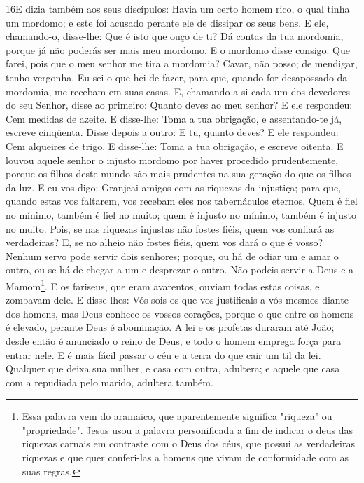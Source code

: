\lettrine{16} E dizia também aos seus discípulos: Havia um
certo homem rico, o qual tinha um mordomo; e este foi acusado
perante ele de dissipar os seus bens. E ele, chamando-o,
disse-lhe: Que é isto que ouço de ti? Dá contas da tua mordomia,
porque já não poderás ser mais meu mordomo. E o mordomo disse
consigo: Que farei, pois que o meu senhor me tira a mordomia? Cavar,
não posso; de mendigar, tenho vergonha. Eu sei o que hei de
fazer, para que, quando for desapossado da mordomia, me recebam em
suas casas. E, chamando a si cada um dos devedores do seu
Senhor, disse ao primeiro: Quanto deves ao meu senhor? E ele
respondeu: Cem medidas de azeite. E disse-lhe: Toma a tua obrigação,
e assentando-te já, escreve cinqüenta. Disse depois a outro: E
tu, quanto deves? E ele respondeu: Cem alqueires de trigo. E
disse-lhe: Toma a tua obrigação, e escreve oitenta. E louvou
aquele senhor o injusto mordomo por haver procedido prudentemente,
porque os filhos deste mundo são mais prudentes na sua geração do
que os filhos da luz. E eu vos digo: Granjeai amigos com as
riquezas da injustiça; para que, quando estas vos faltarem, vos
recebam eles nos tabernáculos eternos. Quem é fiel no mínimo,
também é fiel no muito; quem é injusto no mínimo, também é injusto
no muito. Pois, se nas riquezas injustas não fostes fiéis,
quem vos confiará as verdadeiras? E, se no alheio não fostes
fiéis, quem vos dará o que é vosso? Nenhum servo pode servir
dois senhores; porque, ou há de odiar um e amar o outro, ou se há de
chegar a um e desprezar o outro. Não podeis servir a Deus e a
Mamom\footnote{Essa palavra vem do aramaico, que aparentemente
significa "riqueza" ou "propriedade". Jesus usou a palavra
personificada a fim de indicar o deus das riquezas carnais em
contraste com o Deus dos céus, que possui as verdadeiras riquezas e
que quer conferi-las a homens que vivam de conformidade com as suas
regras.}. E os fariseus, que eram avarentos, ouviam todas
estas coisas, e zombavam dele. E disse-lhes: Vós sois os que
vos justificais a vós mesmos diante dos homens, mas Deus conhece os
vossos corações, porque o que entre os homens é elevado, perante
Deus é abominação. A lei e os profetas duraram até João;
desde então é anunciado o reino de Deus, e todo o homem emprega
força para entrar nele. E é mais fácil passar o céu e a terra
do que cair um til da lei. Qualquer que deixa sua mulher, e
casa com outra, adultera; e aquele que casa com a repudiada pelo
marido, adultera também.

